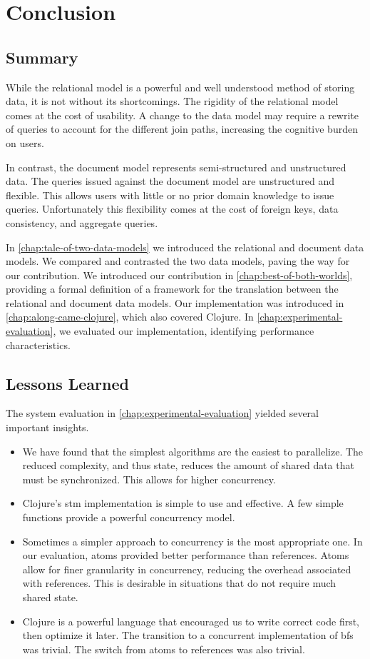 \chapter{Conclusion}
\label{chap:conclusion}
	\section{Summary}
		While the relational model is a powerful and well understood method of storing data, it is not without its shortcomings.  The rigidity of the relational model comes at the cost of usability.  A change to the data model may require a rewrite of queries to account for the different join paths, increasing the cognitive burden on users.
		
		In contrast, the document model represents semi-structured and unstructured data.  The queries issued against the document model are unstructured and flexible.  This allows users with little or no prior domain knowledge to issue queries.  Unfortunately this flexibility comes at the cost of foreign keys, data consistency, and aggregate queries.
		
		In \cref{chap:tale-of-two-data-models} we introduced the relational and document data models.  We compared and contrasted the two data models, paving the way for our contribution.  We introduced our contribution in \cref{chap:best-of-both-worlds}, providing a formal definition of a framework for the translation between the relational and document data models.  Our implementation was introduced in \cref{chap:along-came-clojure}, which also covered Clojure.  In \cref{chap:experimental-evaluation}, we evaluated our implementation, identifying performance characteristics.
		
	\section{Lessons Learned}
		The system evaluation in \cref{chap:experimental-evaluation} yielded several important insights.
		
		\begin{itemize}
			\item We have found that the simplest algorithms are the easiest to parallelize.  The reduced complexity, and thus state, reduces the amount of shared data that must be synchronized.  This allows for higher concurrency.
			\item Clojure's \gls{stm} implementation is simple to use and effective.  A few simple functions provide a powerful concurrency model.
			\item Sometimes a simpler approach to concurrency is the most appropriate one.  In our evaluation, atoms provided better performance than references.  Atoms allow for finer granularity in concurrency, reducing the overhead associated with references.  This is desirable in situations that do not require much shared state.
			\item Clojure is a powerful language that encouraged us to write correct code first, then optimize it later.  The transition to a concurrent implementation of \gls{bfs} was trivial.  The switch from atoms to references was also trivial.
		\end{itemize}